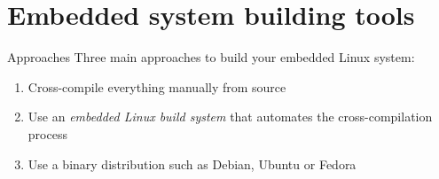 \section{Embedded system building tools}

\begin{frame}{Approaches}
  Three main approaches to build your embedded Linux system:
  \begin{enumerate}
  \item Cross-compile everything manually from source
  \item Use an {\em embedded Linux build system} that automates the
    cross-compilation process
  \item Use a binary distribution such as Debian, Ubuntu or Fedora
  \end{enumerate}
\end{frame}

